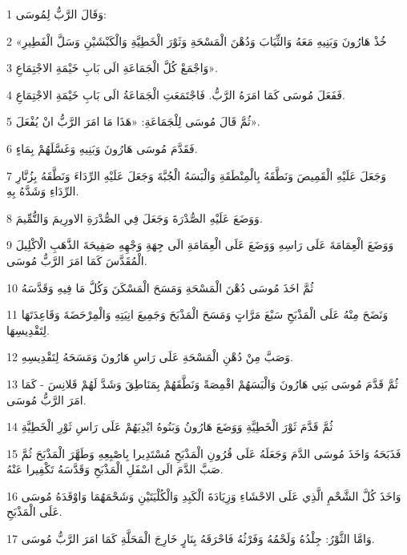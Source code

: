 \par 1 وَقَالَ الرَّبُّ لِمُوسَى:
\par 2 «خُذْ هَارُونَ وَبَنِيهِ مَعَهُ وَالثِّيَابَ وَدُهْنَ الْمَسْحَةِ وَثَوْرَ الْخَطِيَّةِ وَالْكَبْشَيْنِ وَسَلَّ الْفَطِيرِ
\par 3 وَاجْمَعْ كُلَّ الْجَمَاعَةِ الَى بَابِ خَيْمَةِ الاجْتِمَاعِ».
\par 4 فَفَعَلَ مُوسَى كَمَا امَرَهُ الرَّبُّ. فَاجْتَمَعَتِ الْجَمَاعَةُ الَى بَابِ خَيْمَةِ الاجْتِمَاعِ.
\par 5 ثُمَّ قَالَ مُوسَى لِلْجَمَاعَةِ: «هَذَا مَا امَرَ الرَّبُّ انْ يُفْعَلَ».
\par 6 فَقَدَّمَ مُوسَى هَارُونَ وَبَنِيهِ وَغَسَّلَهُمْ بِمَاءٍ.
\par 7 وَجَعَلَ عَلَيْهِ الْقَمِيصَ وَنَطَّقَهُ بِالْمِنْطَقَةِ وَالْبَسَهُ الْجُبَّةَ وَجَعَلَ عَلَيْهِ الرِّدَاءَ وَنَطَّقَهُ بِزُنَّارِ الرِّدَاءِ وَشَدَّهُ بِهِ.
\par 8 وَوَضَعَ عَلَيْهِ الصُّدْرَةَ وَجَعَلَ فِي الصُّدْرَةِ الاورِيمَ وَالتُّمِّيمَ.
\par 9 وَوَضَعَ الْعِمَامَةَ عَلَى رَاسِهِ وَوَضَعَ عَلَى الْعِمَامَةِ الَى جِهَةِ وَجْهِهِ صَفِيحَةَ الذَّهَبِ الْاكْلِيلَ الْمُقَدَّسَ كَمَا امَرَ الرَّبُّ مُوسَى.
\par 10 ثُمَّ اخَذَ مُوسَى دُهْنَ الْمَسْحَةِ وَمَسَحَ الْمَسْكَنَ وَكُلَّ مَا فِيهِ وَقَدَّسَهُ
\par 11 وَنَضَحَ مِنْهُ عَلَى الْمَذْبَحِ سَبْعَ مَرَّاتٍ وَمَسَحَ الْمَذْبَحَ وَجَمِيعَ انِيَتِهِ وَالْمِرْحَضَةَ وَقَاعِدَتَهَا لِتَقْدِيسِهَا.
\par 12 وَصَبَّ مِنْ دُهْنِ الْمَسْحَةِ عَلَى رَاسِ هَارُونَ وَمَسَحَهُ لِتَقْدِيسِهِ.
\par 13 ثُمَّ قَدَّمَ مُوسَى بَنِي هَارُونَ وَالْبَسَهُمْ اقْمِصَةً وَنَطَّقَهُمْ بِمَنَاطِقَ وَشَدَّ لَهُمْ قَلانِسَ - كَمَا امَرَ الرَّبُّ مُوسَى.
\par 14 ثُمَّ قَدَّمَ ثَوْرَ الْخَطِيَّةِ وَوَضَعَ هَارُونُ وَبَنُوهُ ايْدِيَهُمْ عَلَى رَاسِ ثَوْرِ الْخَطِيَّةِ
\par 15 فَذَبَحَهُ وَاخَذَ مُوسَى الدَّمَ وَجَعَلَهُ عَلَى قُرُونِ الْمَذْبَحِ مُسْتَدِيرا بِاصْبِعِهِ وَطَهَّرَ الْمَذْبَحَ ثُمَّ صَبَّ الدَّمَ الَى اسْفَلِ الْمَذْبَحِ وَقَدَّسَهُ تَكْفِيرا عَنْهُ.
\par 16 وَاخَذَ كُلَّ الشَّحْمِ الَّذِي عَلَى الاحْشَاءِ وَزِيَادَةَ الْكَبِدِ وَالْكُلْيَتَيْنِ وَشَحْمَهُمَا وَاوْقَدَهُ مُوسَى عَلَى الْمَذْبَحِ.
\par 17 وَامَّا الثَّوْرُ: جِلْدُهُ وَلَحْمُهُ وَفَرْثُهُ فَاحْرَقَهُ بِنَارٍ خَارِجَ الْمَحَلَّةِ كَمَا امَرَ الرَّبُّ مُوسَى.
